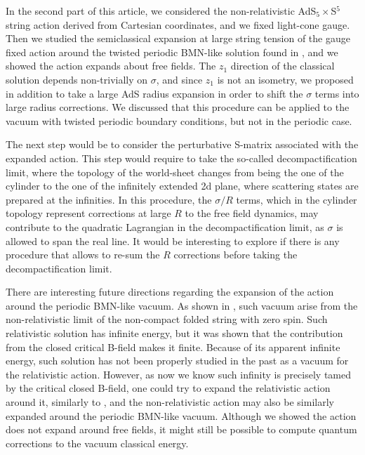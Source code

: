 \documentclass[12pt]{article}
\numberwithin{equation}{section}
\begin{document}
In the second part of this article, we considered the non-relativistic AdS$_5\times$S$^5$ string action derived from Cartesian coordinates, and we fixed light-cone gauge. Then we studied the semiclassical expansion at large string tension of the gauge fixed action around the twisted periodic BMN-like solution found in \cite{Fontanella:2021btt}, and we showed the action expands about free fields. The $z_1$ direction of the classical solution depends non-trivially on $\sigma$, and since $z_1$ is not an isometry, we proposed in addition to take a large AdS radius expansion in order to shift the $\sigma$ terms into large radius corrections. We discussed that this procedure can be applied to the vacuum with twisted periodic boundary conditions, but not in the periodic case.  

The next step would be to consider the perturbative S-matrix associated with the expanded action. This step would require to take the so-called decompactification limit, where the topology of the world-sheet changes from being the one of the cylinder to the one of the infinitely extended 2d plane, where scattering states are prepared at the infinities. In this procedure, the $\sigma / R$ terms, which in the cylinder topology represent corrections at large $R$ to the free field dynamics, may contribute to the quadratic Lagrangian in the decompactification limit, as $\sigma$ is allowed to span the real line. It would be interesting to explore if there is any  procedure that allows to re-sum the $R$ corrections before taking the decompactification limit.       


There are interesting future directions regarding the expansion of the action around the periodic BMN-like vacuum. As shown in \cite{Fontanella:2023men}, such vacuum arise from the non-relativistic limit of the non-compact folded string with zero spin. Such relativistic solution has infinite energy, but it was shown that the contribution from the closed critical B-field makes it finite. Because of its apparent infinite energy, such solution has not been properly studied in the past as a vacuum for the relativistic action. However, as now we know such infinity is precisely tamed by the critical closed B-field, one could try to expand the relativistic action around it, similarly to \cite{Frolov:2002av, Beccaria:2010ry}, and the non-relativistic action may also be similarly expanded around the periodic BMN-like vacuum. Although we showed the action does not expand around free fields, it might still be possible to compute quantum corrections to the vacuum classical energy.        
\end{document}
